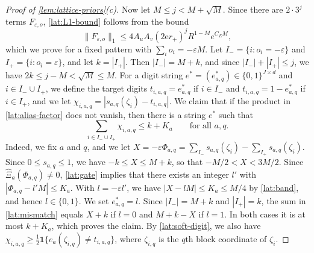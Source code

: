 \begin{proof}[Proof of \cref{lem:lattice-priors}(c)]
Now let $M\le j<M+\sqrt M$. Since there are $2\cdot3^j$ terms
$F_{\varepsilon,o}$, \eqref{lat:L1-bound} follows from the bound
\begin{equation}\label{lat:pattern-bound}
 \|F_{\varepsilon,o}\|_1\le4A_uA_v(2\mathrm er_+)^jR^{1-M}e^{C_EM},
\end{equation}
which we prove for a fixed pattern with $\sum_io_i=-\varepsilon M$. Let
$I_-=\{i:o_i=-\varepsilon\}$ and $I_+=\{i:o_i=\varepsilon\}$, and let
$k=|I_+|$. Then $|I_-|=M+k$, and since $|I_-|+|I_+|\le j$, we have
$2k\le j-M<\sqrt M\le M$. For a digit string
$e^*=(e^*_{a,q})\in\{0,1\}^{J\times d}$ and $i\in I_-\cup I_+$, we
define the target digits $t_{i,a,q}=e^*_{a,q}$ if $i\in I_-$ and
$t_{i,a,q}=1-e^*_{a,q}$ if $i\in I_+$, and we let
$\chi_{i,a,q}=|s_{a,q}(\zeta_i)-t_{i,a,q}|$. We claim that if the
product in \eqref{lat:alias-factor} does not vanish, then there is a
string $e^*$ such that
\begin{equation}\label{lat:mismatch}
 \sum_{i\in I_-\cup I_+}\chi_{i,a,q}\le k+K_a
 \qquad\text{for all }a,q.
\end{equation}
Indeed, we fix $a$ and $q$, and we let
$X=-\varepsilon\Phi_{a,q}=\sum_{I_-}s_{a,q}(\zeta_i)-\sum_{I_+}s_{a,q}(\zeta_i)$.
Since $0\le s_{a,q}\le1$, we have $-k\le X\le M+k$, so that
$-M/2<X<3M/2$. Since $\widehat\Xi_a(\Phi_{a,q})\ne0$,
\cref{lat:gate} implies that there exists an integer $l'$ with
$|\Phi_{a,q}-l'M|\le K_a$. With $l=-\varepsilon l'$, we have
$|X-lM|\le K_a\le M/4$ by \eqref{lat:band}, and hence $l\in\{0,1\}$. We
set $e^*_{a,q}=l$. Since $|I_-|=M+k$ and $|I_+|=k$, the sum in
\eqref{lat:mismatch} equals $X+k$ if $l=0$ and $M+k-X$ if $l=1$. In
both cases it is at most $k+K_a$, which proves the claim. By
\eqref{lat:soft-digit}, we also have
$\chi_{i,a,q}\ge\frac12\mathbf 1\{e_a(\zeta_{i,q})\ne t_{i,a,q}\}$,
where $\zeta_{i,q}$ is the $q$th block coordinate of $\zeta_i$.


\end{proof}
